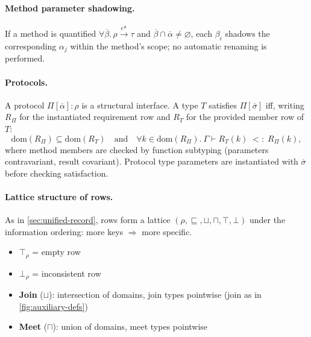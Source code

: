 \paragraph{Method parameter shadowing.}
If a method is quantified $\forall\overline{\beta}.\,\rho \xrightarrow{\epsilon^\#} \tau$ and $\overline{\beta} \cap \overline{\alpha} \neq \varnothing$, each $\beta_i$ shadows the corresponding $\alpha_j$ within the method’s scope; no automatic renaming is performed.

\paragraph{Protocols.}
A protocol $\Pi[\overline{\alpha}]: \rho$ is a structural interface.
A type $T$ satisfies $\Pi[\overline{\sigma}]$ iff, writing $R_\Pi$ for the instantiated requirement row and $R_T$ for the provided member row of $T$:
\[
\mathrm{dom}(R_\Pi) \subseteq \mathrm{dom}(R_T)
\quad\text{and}\quad
\forall k \in \mathrm{dom}(R_\Pi).\ \Gamma \vdash R_T(k) \;<:\; R_\Pi(k),
\]
where method members are checked by function subtyping (parameters contravariant, result covariant). Protocol type parameters are instantiated with $\overline{\sigma}$ before checking satisfaction.

\paragraph{Lattice structure of rows.}
As in \autoref{sec:unified-record}, rows form a lattice $(\mathcal{\rho}, \sqsubseteq, \sqcup, \sqcap, \top, \bot)$ under the information ordering: more keys $\Rightarrow$ more specific.
\begin{itemize}
  \item $\top_\rho$ = empty row
  \item $\bot_\rho$ = inconsistent row
  \item \textbf{Join} ($\sqcup$): intersection of domains, join types pointwise (join as in \autoref{fig:auxiliary-defs})
  \item \textbf{Meet} ($\sqcap$): union of domains, meet types pointwise
\end{itemize}

